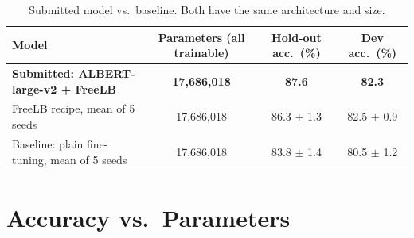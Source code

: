 \documentclass[11pt]{article}
\begin{document}
\begin{table}[h]
\centering\small
\caption{Submitted model vs.\ baseline. Both have the same architecture and size.}
\label{tab:final}
\begin{tabular}{lccc}
\toprule
Model & Parameters (all trainable) & Hold-out acc.\ (\%) & Dev acc.\ (\%) \\
\midrule
\textbf{Submitted: ALBERT-large-v2 + FreeLB} & \textbf{17,686,018} & \textbf{87.6} & \textbf{82.3} \\
FreeLB recipe, mean of 5 seeds          & 17,686,018 & 86.3 $\pm$ 1.3 & 82.5 $\pm$ 0.9 \\
Baseline: plain fine-tuning, mean of 5 seeds & 17,686,018 & 83.8 $\pm$ 1.4 & 80.5 $\pm$ 1.2 \\
\bottomrule
\end{tabular}
\end{table}

\section{Accuracy vs.\ Parameters}
\end{document}
